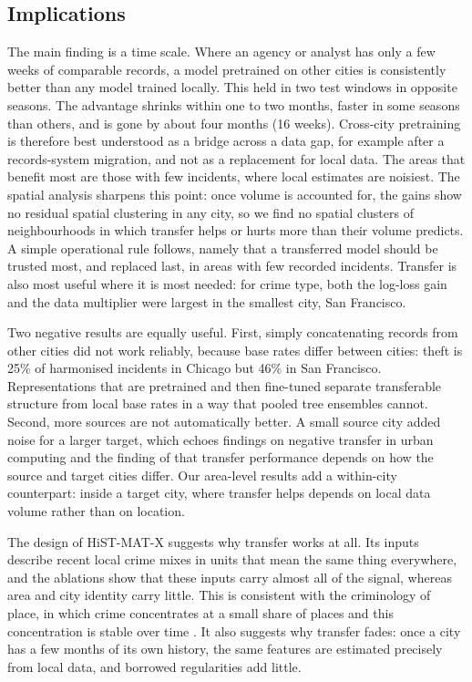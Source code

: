 \documentclass[11pt]{article}
\newcommand{\HMX}{HiST-MAT-X}
\begin{document}
\subsection{Implications}
The main finding is a time scale. Where an agency or analyst has only a few weeks of comparable records, a model pretrained on other cities is consistently better than any model trained locally. This held in two test windows in opposite seasons. The advantage shrinks within one to two months, faster in some seasons than others, and is gone by about four months (16 weeks). Cross-city pretraining is therefore best understood as a bridge across a data gap, for example after a records-system migration, and not as a replacement for local data. The areas that benefit most are those with few incidents, where local estimates are noisiest. The spatial analysis sharpens this point: once volume is accounted for, the gains show no residual spatial clustering in any city, so we find no spatial clusters of neighbourhoods in which transfer helps or hurts more than their volume predicts. A simple operational rule follows, namely that a transferred model should be trusted most, and replaced last, in areas with few recorded incidents. Transfer is also most useful where it is most needed: for crime type, both the log-loss gain and the data multiplier were largest in the smallest city, San Francisco.

Two negative results are equally useful. First, simply concatenating records from other cities did not work reliably, because base rates differ between cities: theft is 25\% of harmonised incidents in Chicago but 46\% in San Francisco. Representations that are pretrained and then fine-tuned separate transferable structure from local base rates in a way that pooled tree ensembles cannot. Second, more sources are not automatically better. A small source city added noise for a larger target, which echoes findings on negative transfer in urban computing \citep{jin2022crosstres} and the finding of \citet{shan2026} that transfer performance depends on how the source and target cities differ. Our area-level results add a within-city counterpart: inside a target city, where transfer helps depends on local data volume rather than on location.

The design of \HMX{} suggests why transfer works at all. Its inputs describe recent local crime mixes in units that mean the same thing everywhere, and the ablations show that these inputs carry almost all of the signal, whereas area and city identity carry little. This is consistent with the criminology of place, in which crime concentrates at a small share of places and this concentration is stable over time \citep{weisburd2015}. It also suggests why transfer fades: once a city has a few months of its own history, the same features are estimated precisely from local data, and borrowed regularities add little.
\end{document}
